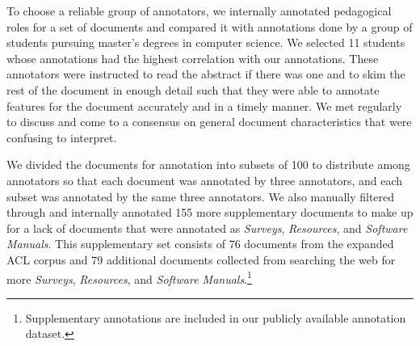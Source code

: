 \documentclass[11pt,a4paper]{article}
\begin{document}
%
%
% 
%
% 
%

To choose a reliable group of annotators, we internally annotated pedagogical roles for a set of documents and compared it with annotations done by a group of students pursuing master's degrees in computer science. We selected 11 students whose annotations had the highest correlation with our annotations. These annotators were instructed to read the abstract if there was one and to skim the rest of the document in enough detail such that they were able to annotate features for the document accurately and in a timely manner. We met regularly to discuss and come to a consensus on general document characteristics that were confusing to interpret.

We divided the documents for annotation into subsets of 100 to distribute among annotators so that each document was annotated by three annotators, and each subset was annotated by the same three annotators. We also manually filtered through and internally annotated 155 more supplementary documents to make up for a lack of documents that were annotated as \textit{Surveys}, \textit{Resources}, and \textit{Software Manuals}. This supplementary set consists of 76 documents from the expanded ACL corpus and 79 additional documents collected from searching the web for more \textit{Surveys}, \textit{Resources}, and \textit{Software Manuals}.\footnote{Supplementary annotations are included in our publicly available annotation dataset.}
\end{document}
